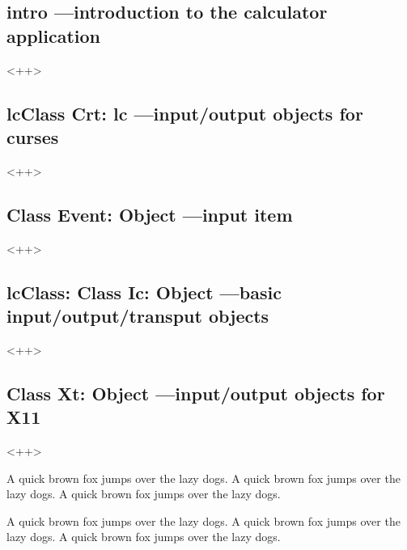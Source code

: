 \subsection{intro ---introduction to the calculator application}
<++>

\subsection{lcClass Crt: lc ---input/output objects for curses}
<++>

\subsection{Class Event: Object ---input item}
<++>

\subsection{lcClass: Class Ic: Object ---basic input/output/transput objects}
<++>

\subsection{Class Xt: Object ---input/output objects for X11}
<++>

A quick brown fox jumps over the lazy dogs.
A quick brown fox jumps over the lazy dogs.
A quick brown fox jumps over the lazy dogs.

A quick brown fox jumps over the lazy dogs.
A quick brown fox jumps over the lazy dogs.
A quick brown fox jumps over the lazy dogs.

\newpage{\thispagestyle{empty}\cleardoublepage}

